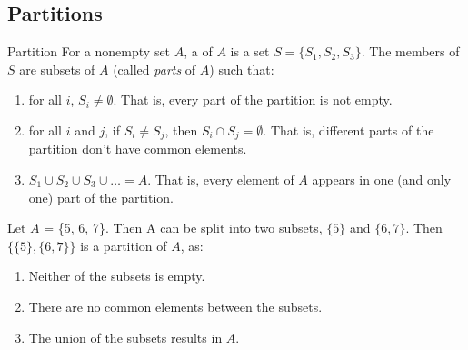 \documentclass[../notes.tex]{subfiles}
\begin{document}
			\subsection{Partitions}
				\begin{definition}{Partition}
					For a nonempty set $A$, a  of $A$ is a set $S = \{S_{1}, S_{2}, S_{3}\}$. The members of $S$ are subsets of $A$ (called \emph{parts} of $A$) such that:
					\begin{enumerate}
						\item for all $i$, $S_{i} \neq \emptyset$. That is, every part of the partition is not empty.
						\item for all $i$ and $j$, if $S_{i} \neq S_{j}$, then $S_{i} \cap S_{j} = \emptyset$. That is, different parts of the partition don't have common elements.
						\item $S_{1} \cup S_{2} \cup S_{3} \cup \ldots = A$. That is, every element of $A$ appears in one (and only one) part of the partition.
					\end{enumerate}
				\end{definition}
				\begin{example}
					Let $A$ = \{5, 6, 7\}. Then A can be split into two subsets, $\{5\}$ and $\{6, 7\}$. Then $\bigl\{\{5\}, \{6, 7\}\bigr\}$ is a partition of $A$, as:
					\begin{enumerate}
						\item Neither of the subsets is empty.
						\item There are no common elements between the subsets.
						\item The union of the subsets results in $A$.
					\end{enumerate}
				\end{example}
\end{document}

